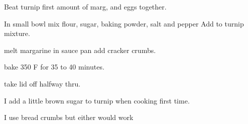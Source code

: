 Beat turnip first amount of marg, and eggs together.

In small bowl mix flour, sugar, baking powder, salt and pepper Add to turnip mixture.

melt margarine  in sauce pan add  cracker crumbs.

bake 350 \degree F for 35 to 40 minutes.

take lid off halfway thru.

I add a little brown sugar to turnip when cooking first time.

I use bread crumbs but either would work